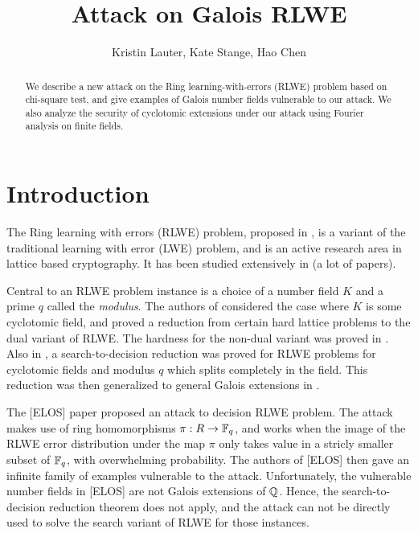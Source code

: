 \documentclass{amsart}
\title{Attack on Galois RLWE}
\author{Kristin Lauter, Kate Stange, Hao Chen}
\begin{document}
\maketitle

\begin{abstract}
We describe a new attack on the Ring learning-with-errors (RLWE) problem based on chi-square test, and give examples of Galois number fields vulnerable to our attack. We also analyze the security of cyclotomic extensions under our attack using Fourier analysis on finite fields.

\end{abstract}

\section{Introduction}
The Ring learning with errors (RLWE) problem, proposed in \cite{lyubashevsky2013ideal}, is a variant of the traditional learning with error (LWE) problem, and is an active research area in lattice based cryptography. It has been studied extensively in (a lot of papers).

Central to an RLWE problem instance is a choice of a number field $K$ and a prime $q$ called the {\it modulus}. The authors of \cite{lyubashevsky2013ideal} considered the case where $K$ is some cyclotomic field, and proved a reduction from certain hard lattice problems to the dual variant of RLWE. The hardness for the non-dual variant was proved in \cite{ducas2012ring}. Also in \cite{lyubashevsky2013ideal}, a search-to-decision reduction was proved for RLWE problems for cyclotomic fields and modulus $q$ which splits completely in the field. This reduction was then generalized to general Galois extensions in \cite{eisentrager2014weak}.

The [ELOS] paper proposed an attack to decision RLWE problem. The attack makes use of ring homomorphisms $\pi: R \to \mathbb{F}_q$, and works when the image of the RLWE error distribution under the map $\pi$ only takes value in a stricly smaller subset of $\mathbb{F}_q$, with overwhelming probability. The authors of [ELOS] then gave an infinite family of examples vulnerable to the attack. Unfortunately, the vulnerable number fields in [ELOS] are not Galois extensions of $\mathbb{Q}$. Hence, the search-to-decision reduction theorem does not apply, and the attack can not be directly used to solve the search variant of RLWE for those instances.
\end{document}
